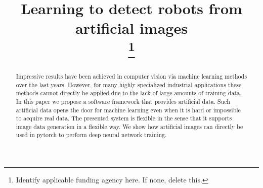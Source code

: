 \documentclass[conference]{IEEEtran}
\begin{document}
\title{Learning to detect robots from artificial images\\
\thanks{Identify applicable funding agency here. If none, delete this.}
}

\author{
\and
{}
\and
{}
}

\maketitle

\begin{abstract}
Impressive results have been achieved in computer vision via machine learning methods over the last years. However, for many highly specialized industrial applications these methods cannot directly be applied due to the lack of large amounts of training data. In this paper we propose a software framework that provides artificial data. Such artificial data opens the door for machine learning even when it is hard or impossible to acquire real data. The presented system is flexible in the sense that it supports image data generation in a flexible way. We show how artificial images can directly be used in pytorch to perform deep neural network training. 
\end{abstract}
\end{document}
